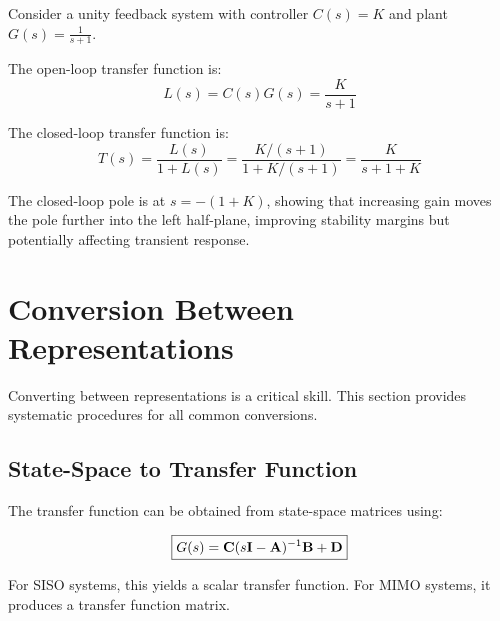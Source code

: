 \begin{examplebox}[title=Example 4.4: Feedback System Block Diagram]
Consider a unity feedback system with controller $C(s) = K$ and plant $G(s) = \frac{1}{s+1}$.

The open-loop transfer function is:
\begin{equation}
L(s) = C(s)G(s) = \frac{K}{s+1}
\end{equation}

The closed-loop transfer function is:
\begin{equation}
T(s) = \frac{L(s)}{1 + L(s)} = \frac{K/(s+1)}{1 + K/(s+1)} = \frac{K}{s + 1 + K}
\end{equation}

The closed-loop pole is at $s = -(1+K)$, showing that increasing gain moves the pole further into the left half-plane, improving stability margins but potentially affecting transient response.
\end{examplebox}

\section{Conversion Between Representations}
\label{sec:conversions}

Converting between representations is a critical skill. This section provides systematic procedures for all common conversions.

\subsection{State-Space to Transfer Function}

The transfer function can be obtained from state-space matrices using:

\begin{equation}
\boxed{G(s) = \mathbf{C}(s\mathbf{I} - \mathbf{A})^{-1}\mathbf{B} + \mathbf{D}}
\label{eq:ss_to_tf}
\end{equation}

For SISO systems, this yields a scalar transfer function. For MIMO systems, it produces a transfer function matrix.


